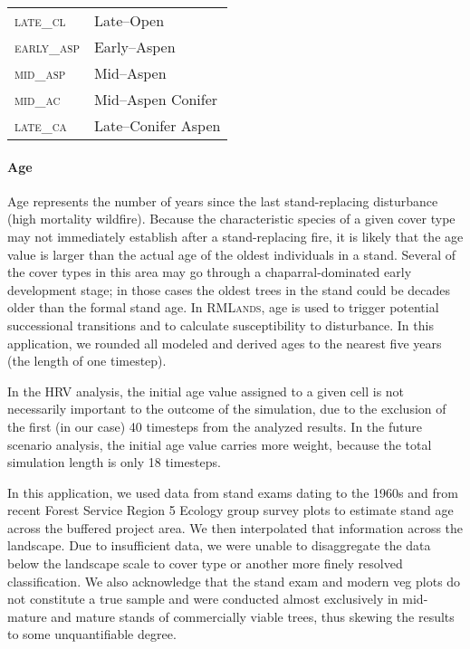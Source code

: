 \begin{table}[!htbp]
\begin{tabular}{@{}ll@{}}
                          \textsc{late\_cl     }  & Late--Open                     \\
\rowcolor[HTML]{CAD6BA}   \textsc{early\_asp  }   & Early--Aspen                   \\
                          \textsc{mid\_asp   }    & Mid--Aspen                     \\
\rowcolor[HTML]{CAD6BA}   \textsc{mid\_ac    }    & Mid--Aspen Conifer             \\
                          \textsc{late\_ca    }   & Late--Conifer Aspen            \\ \bottomrule
\end{tabular}
\end{table}



\paragraph{Age}
Age represents the number of years since the last stand-replacing disturbance (high mortality wildfire). Because the characteristic species of a given cover type may not immediately establish after a stand-replacing fire, it is likely that the age value is larger than the actual age of the oldest individuals in a stand. Several of the cover types in this area may go through a chaparral-dominated early development stage; in those cases the oldest trees in the stand could be decades older than the formal stand age. In \textsc{RMLands}, age is used to trigger potential successional transitions and to calculate susceptibility to disturbance. In this application, we rounded all modeled and derived ages to the nearest five years (the length of one timestep).

In the HRV analysis, the initial age value assigned to a given cell is not necessarily important to the outcome of the simulation, due to the exclusion of the first (in our case) 40 timesteps from the analyzed results. In the future scenario analysis, the initial age value carries more weight, because the total simulation length is only 18 timesteps.

In this application, we used data from stand exams dating to the 1960s and from recent Forest Service Region 5 Ecology group survey plots to estimate stand age across the buffered project area. We then interpolated that information across the landscape. Due to insufficient data, we were unable to disaggregate the data below the landscape scale to cover type or another more finely resolved classification. We also acknowledge that the stand exam and modern veg plots do not constitute a true sample and were conducted almost exclusively in mid-mature and mature stands of commercially viable trees, thus skewing the results to some unquantifiable degree.

